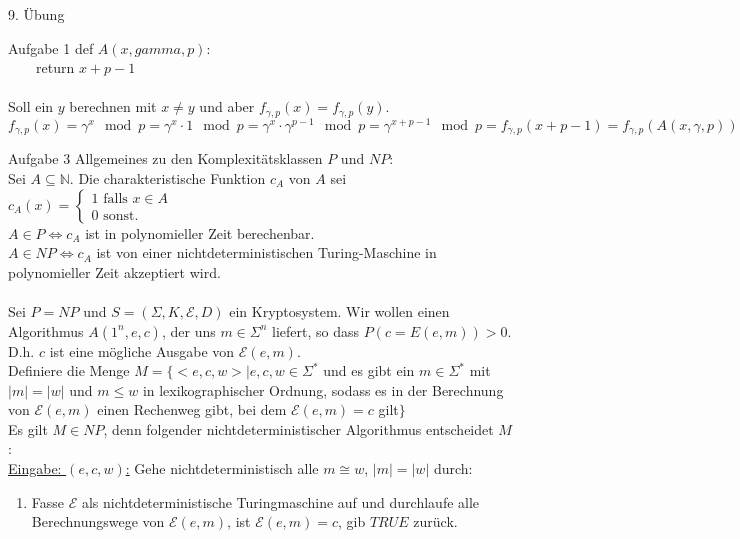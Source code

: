 \begin{section}{9. Übung}
 \begin{subsection}{Aufgabe 1}
  def $A(x,gamma,p): $\\
  \-\ \-\ \-\ \-\ return $ x + p - 1$ \\ \\
  Soll ein $y$ berechnen mit $x \neq y$ und aber $f_{\gamma,p}(x) = f_{\gamma,p}(y)$.\\
  $f_{\gamma,p}(x) = \gamma^x \mod p = \gamma^x \cdot 1 \mod p = \gamma^x\cdot\gamma^{p-1}\mod p = \gamma^{x+p-1}\mod p = f_{\gamma,p}(x+p-1) = f_{\gamma,p}(A(x,\gamma,p))$
 \end{subsection}
 \begin{subsection}{Aufgabe 3}
   Allgemeines zu den Komplexitätsklassen $P$ und $NP$: \\
   Sei $A \subseteq \mathbb{N}$. Die charakteristische Funktion $c_A$ von $A$ sei\\
   $c_A(x) = \begin{cases}
              1 \text{ falls } x \in A\\
              0 \text{ sonst.}
             \end{cases}$\\
   $A \in P \Leftrightarrow c_A$ ist in polynomieller Zeit berechenbar. \\
   $A \in NP \Leftrightarrow c_A$ ist von einer nichtdeterministischen Turing-Maschine in polynomieller Zeit akzeptiert wird.\\ \\
   Sei $P = NP$ und $S=(\Sigma,K,\mathcal{E},D)$ ein Kryptosystem. Wir wollen einen Algorithmus $A(1^n,e,c)$, der uns $m \in \Sigma^n$ liefert, so dass $P(c=E(e,m)) > 0$. D.h. $c$ ist eine mögliche Ausgabe von $\mathcal{E}(e,m)$. \\
   Definiere die Menge $M = \{<e,c,w>|e,c,w \in \Sigma^*$ und es gibt ein $m\in \Sigma^*$ mit $|m| = |w|$ und $m\leq w$ in lexikographischer Ordnung, sodass es in der Berechnung von $\mathcal{E}(e,m)$ einen Rechenweg gibt, bei dem $\mathcal{E}(e,m) = c$ gilt$\}$ \\
   Es gilt $M \in NP$, denn folgender nichtdeterministischer Algorithmus entscheidet $M$:\\
   \underline{Eingabe: $(e,c,w)$:} 
   Gehe nichtdeterministisch alle $m \cong w$, $|m| = |w|$ durch:\\
    \begin{enumerate}[]
     \item Fasse $\mathcal{E}$ als nichtdeterministische Turingmaschine auf und durchlaufe alle Berechnungswege von $\mathcal{E}(e,m)$, ist $\mathcal{E}(e,m) = c$, gib $TRUE$ zurück.

\end{enumerate}
\end{subsection}
\end{section}
